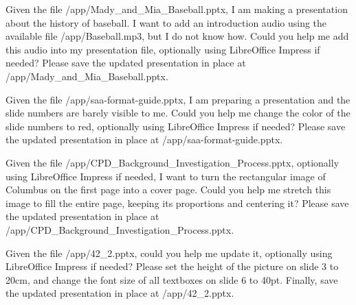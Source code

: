 \begin{instructionbox}
Given the file \textasciigrave{}/app/Mady\_and\_Mia\_Baseball.pptx\textasciigrave{}, I am making a presentation about the history of baseball. I want to add an introduction audio using the available file \textasciigrave{}/app/Baseball.mp3\textasciigrave{}, but I do not know how. Could you help me add this audio into my presentation file, optionally using LibreOffice Impress if needed? Please save the updated presentation in place at \textasciigrave{}/app/Mady\_and\_Mia\_Baseball.pptx\textasciigrave{}.
\end{instructionbox}

\begin{instructionbox}
Given the file \textasciigrave{}/app/saa-format-guide.pptx\textasciigrave{}, I am preparing a presentation and the slide numbers are barely visible to me. Could you help me change the color of the slide numbers to red, optionally using LibreOffice Impress if needed? Please save the updated presentation in place at \textasciigrave{}/app/saa-format-guide.pptx\textasciigrave{}.
\end{instructionbox}

\begin{instructionbox}
Given the file \textasciigrave{}/app/CPD\_Background\_Investigation\_Process.pptx\textasciigrave{}, optionally using LibreOffice Impress if needed, I want to turn the rectangular image of Columbus on the first page into a cover page. Could you help me stretch this image to fill the entire page, keeping its proportions and centering it? Please save the updated presentation in place at \textasciigrave{}/app/CPD\_Background\_Investigation\_Process.pptx\textasciigrave{}.
\end{instructionbox}

\begin{instructionbox}
Given the file \textasciigrave{}/app/42\_2.pptx\textasciigrave{}, could you help me update it, optionally using LibreOffice Impress if needed? Please set the height of the picture on slide 3 to 20cm, and change the font size of all textboxes on slide 6 to 40pt. Finally, save the updated presentation in place at \textasciigrave{}/app/42\_2.pptx\textasciigrave{}.
\end{instructionbox}

